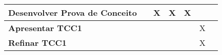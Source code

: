 \begin{table}[h]
\begin{adjustbox}{width=\textwidth}
\begin{tabular}{|l|c|c|c|c|c|c|}
\textbf{Desenvolver Prova de Conceito}          &                                      & X                                      & X                                     & X                                      &                                        \\ \hline
\textbf{Apresentar TCC1}                        &                                      &                                        &                                       &                                        & X                                      \\ \hline
\textbf{Refinar TCC1}                           &                                      &                                        &                                       &                                        & X                                      \\ \hline
\end{tabular}
\end{adjustbox}
\end{table}

